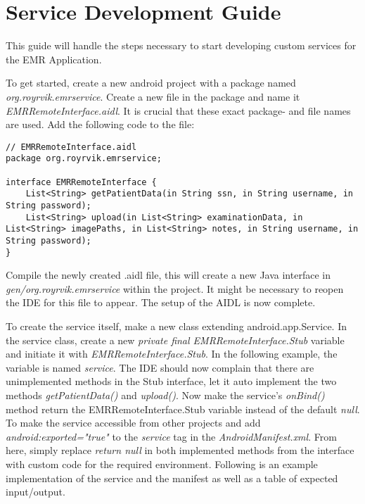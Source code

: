 \section{Service Development Guide}
\label{devmanual}

This guide will handle the steps necessary to start developing custom services for the EMR Application.

To get started, create a new android project with a package named \textit{org.royrvik.emrservice}. Create a new file in the package and name it \textit{EMRRemoteInterface.aidl}. It is crucial that these exact package- and file names are used. Add the following code to the file:
\newline


\begin{lstlisting}[caption={EMRRemoteInterface.aidl}, label={lst:emrremoteinterface}]
// EMRRemoteInterface.aidl
package org.royrvik.emrservice;

interface EMRRemoteInterface {
    List<String> getPatientData(in String ssn, in String username, in String password);
    List<String> upload(in List<String> examinationData, in List<String> imagePaths, in List<String> notes, in String username, in String password);
}
\end{lstlisting}

\smallskip

Compile the newly created .aidl file, this will create a new Java interface in \textit{gen/org.royrvik.emrservice} within the project. It might be necessary to reopen the IDE for this file to appear. The setup of the AIDL is now complete.

To create the service itself, make a new class extending android.app.Service. In the service class, create a new \textit{private final EMRRemoteInterface.Stub} variable and initiate it with \textit{EMRRemoteInterface.Stub}. In the following example, the variable is named \textit{service}. The IDE should now complain that there are unimplemented methods in the Stub interface, let it auto implement the two methods \textit{getPatientData()} and \textit{upload()}. Now make the service's \textit{onBind()} method return the EMRRemoteInterface.Stub variable instead of the default \textit{null}. To make the service accessible from other projects and add \textit{android:exported="true"} to the \textit{service} tag in the \textit{AndroidManifest.xml}. From here, simply replace \textit{return null} in both implemented methods from the interface with custom code for the required environment. Following is an example implementation of the service and the manifest as well as a table of expected input/output.


